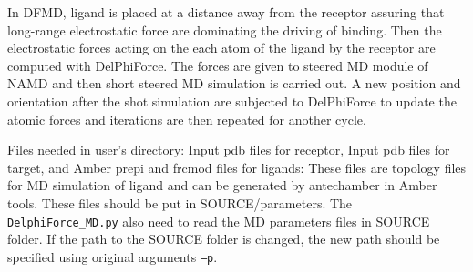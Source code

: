 \documentclass[9pt,tutorial]{livecoms}
\begin{document}
In DFMD, ligand is placed at a distance away from the receptor assuring that long-range electrostatic force are dominating the driving of binding. Then the electrostatic forces acting on the each atom of the ligand by the receptor are computed with DelPhiForce\cite{li2017delphiforce}. The forces are given to steered MD module of NAMD and then short steered MD simulation is carried out. A new position and orientation after the shot simulation are subjected to DelPhiForce to update the atomic forces and iterations are then repeated for another cycle.

Files needed in user’s directory:
Input pdb files for receptor, Input pdb files for target, and Amber prepi and frcmod files for ligands: These files are topology files for MD simulation of ligand and can be generated by antechamber in Amber tools. These files should be put in SOURCE/parameters. The \texttt{DelphiForce\_MD.py} also need to read the MD parameters files in SOURCE folder. If the path to the SOURCE folder is changed, the new path should be specified using original arguments \texttt{–p}.
\end{document}

